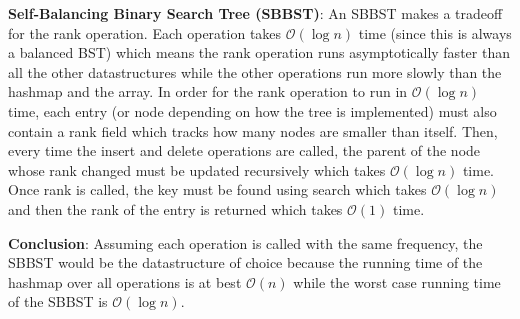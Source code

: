 \textbf{Self-Balancing Binary Search Tree (SBBST)}:
An SBBST makes a tradeoff for the rank operation. Each operation takes $\mathcal{O}(\log{n})$ time (since this is always a balanced BST) which means the rank operation runs asymptotically faster than all the other datastructures while the other operations run more slowly than the hashmap and the array. In order for the rank operation to run in $\mathcal{O}(\log{n})$ time, each entry (or node depending on how the tree is implemented) must also contain a rank field which tracks how many nodes are smaller than itself. Then, every time the insert and delete operations are called, the parent of the node whose rank changed must be updated recursively which takes $\mathcal{O}(\log{n})$ time. Once rank is called, the key must be found using search which takes $\mathcal{O}(\log{n})$ and then the rank of the entry is returned which takes $\mathcal{O}(1)$ time.

\textbf{Conclusion}:
Assuming each operation is called with the same frequency, the SBBST would be the datastructure of choice because the running time of the hashmap over all operations is at best $\mathcal{O}(n)$ while the worst case running time of the SBBST is $\mathcal{O}(\log{n})$.